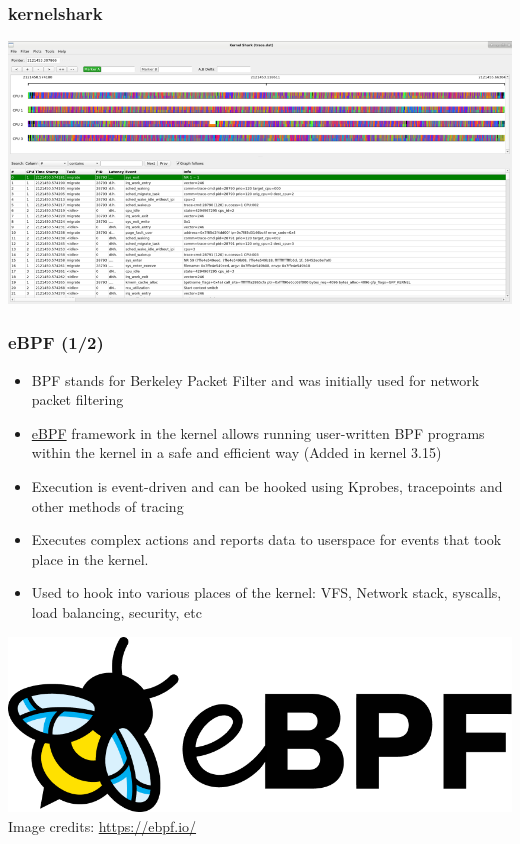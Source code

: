 \begin{frame}
  \frametitle{kernelshark}
  \center\includegraphics[height=0.8\textheight]{slides/debugging-system-wide-profiling/kernelshark.png}
\end{frame}

\begin{frame}
  \frametitle{eBPF (1/2)}
  \begin{itemize}
    \item BPF stands for Berkeley Packet Filter and was initially used
          for network packet filtering
    \item \href{https://ebpf.io/}{eBPF} framework in the kernel allows running
          user-written BPF programs within the kernel in a safe and efficient
          way (Added in kernel 3.15)
    \item Execution is event-driven and can be hooked using Kprobes, tracepoints
          and other methods of tracing
    \item Executes complex actions and reports data to userspace for
          events that took place in the kernel.
    \item Used to hook into various places of the kernel: VFS, Network stack,
          syscalls, load balancing, security, etc
  \end{itemize}
  \center\includegraphics[height=0.2\textheight]{slides/debugging-linux-application-stack/logo_ebpf.png}\\ 
  \tiny Image credits: \url{https://ebpf.io/}
\end{frame}

